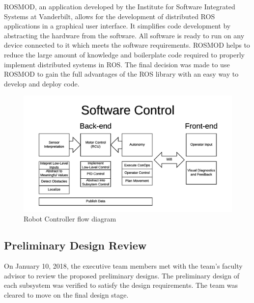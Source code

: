 \documentclass[class=article, crop=false]{standalone}
\begin{document}
	ROSMOD, an application developed by the Institute for Software Integrated Systems at Vanderbilt, allows for the development of distributed ROS applications in a graphical user interface. It simplifies code development by abstracting the hardware from the software. All software is ready to run on any device connected to it which meets the software requirements. ROSMOD helps to reduce the large amount of knowledge and boilerplate code required to properly implement distributed systems in ROS. The final decision was made to use ROSMOD to gain the full advantages of the ROS library with an easy way to develop and deploy code.

	\FloatBarrier
	\begin{figure}[h]
	\centering
	 \includegraphics[width=0.8\linewidth]{09_Figures/data-control-high-level.jpg}
	 \caption{Robot Controller flow diagram}
	 \label{fig:data-control}
	\end{figure}
	\FloatBarrier
	
	
	
	\subsection{Preliminary Design Review}
	
	On January 10, 2018, the executive team members met with the team's faculty advisor to review the proposed preliminary designs. The preliminary design of each subsystem was verified to satisfy the design requirements. The team was cleared to move on the final design stage. 

	
	


	
\end{document}
